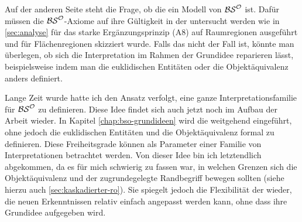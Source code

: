     Auf
    der anderen Seite steht die Frage, ob die \strukt ein Modell von $\mathcal{BS}^{\mathcal{O}}$ ist. Dafür müssen die $\mathcal{BS}^{\mathcal{O}}$-Axiome auf ihre Gültigkeit in der \strukt untersucht werden wie in \ref{sec:analyse} für das starke Ergänzungsprinzip (A8) auf Raumregionen ausgeführt und für Flächenregionen skizziert wurde.
    Falls das nicht der Fall ist, könnte man überlegen, ob sich die Interpretation im Rahmen der Grundidee reparieren lässt, beispielsweise indem man die euklidischen Entitäten oder die Objektäquivalenz anders definiert.
    
    Lange Zeit
    wurde hatte ich den Ansatz verfolgt, eine ganze Interpretationsfamilie für $\mathcal{BS}^{\mathcal{O}}$ zu definieren.
    Diese Idee findet sich auch jetzt noch im Aufbau der Arbeit wieder.
    In Kapitel \ref{chap:bso-grundideen} wird die \strukt weitgehend eingeführt, ohne jedoch die euklidischen Entitäten und die Objektäquivalenz formal zu definieren.
    Diese Freiheitsgrade können als Parameter einer Familie von Interpretationen betrachtet werden.
    Von dieser Idee bin ich letztendlich abgekommen, da es für mich schwierig zu fassen war, in welchen Grenzen sich die Objektäquivalenz und der zugrundegelegte Randbegriff bewegen sollten (siehe hierzu auch \ref{sec:kaskadierter-ro}).
    Sie spiegelt jedoch die Flexibilität der \strukt wieder, die neuen Erkenntnissen relativ einfach angepasst werden kann, ohne dass ihre Grundidee aufgegeben wird.


